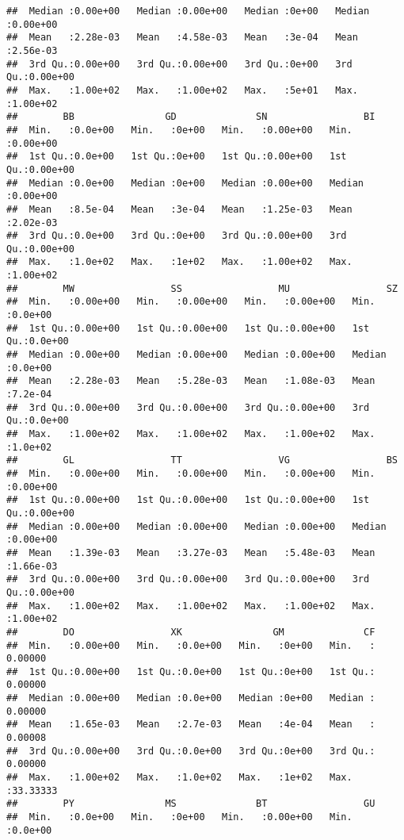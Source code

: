 \documentclass[
]{article}
\begin{document}
\begin{verbatim}
##  Median :0.00e+00   Median :0.00e+00   Median :0e+00   Median :0.00e+00  
##  Mean   :2.28e-03   Mean   :4.58e-03   Mean   :3e-04   Mean   :2.56e-03  
##  3rd Qu.:0.00e+00   3rd Qu.:0.00e+00   3rd Qu.:0e+00   3rd Qu.:0.00e+00  
##  Max.   :1.00e+02   Max.   :1.00e+02   Max.   :5e+01   Max.   :1.00e+02  
##        BB                GD              SN                 BI          
##  Min.   :0.0e+00   Min.   :0e+00   Min.   :0.00e+00   Min.   :0.00e+00  
##  1st Qu.:0.0e+00   1st Qu.:0e+00   1st Qu.:0.00e+00   1st Qu.:0.00e+00  
##  Median :0.0e+00   Median :0e+00   Median :0.00e+00   Median :0.00e+00  
##  Mean   :8.5e-04   Mean   :3e-04   Mean   :1.25e-03   Mean   :2.02e-03  
##  3rd Qu.:0.0e+00   3rd Qu.:0e+00   3rd Qu.:0.00e+00   3rd Qu.:0.00e+00  
##  Max.   :1.0e+02   Max.   :1e+02   Max.   :1.00e+02   Max.   :1.00e+02  
##        MW                 SS                 MU                 SZ         
##  Min.   :0.00e+00   Min.   :0.00e+00   Min.   :0.00e+00   Min.   :0.0e+00  
##  1st Qu.:0.00e+00   1st Qu.:0.00e+00   1st Qu.:0.00e+00   1st Qu.:0.0e+00  
##  Median :0.00e+00   Median :0.00e+00   Median :0.00e+00   Median :0.0e+00  
##  Mean   :2.28e-03   Mean   :5.28e-03   Mean   :1.08e-03   Mean   :7.2e-04  
##  3rd Qu.:0.00e+00   3rd Qu.:0.00e+00   3rd Qu.:0.00e+00   3rd Qu.:0.0e+00  
##  Max.   :1.00e+02   Max.   :1.00e+02   Max.   :1.00e+02   Max.   :1.0e+02  
##        GL                 TT                 VG                 BS          
##  Min.   :0.00e+00   Min.   :0.00e+00   Min.   :0.00e+00   Min.   :0.00e+00  
##  1st Qu.:0.00e+00   1st Qu.:0.00e+00   1st Qu.:0.00e+00   1st Qu.:0.00e+00  
##  Median :0.00e+00   Median :0.00e+00   Median :0.00e+00   Median :0.00e+00  
##  Mean   :1.39e-03   Mean   :3.27e-03   Mean   :5.48e-03   Mean   :1.66e-03  
##  3rd Qu.:0.00e+00   3rd Qu.:0.00e+00   3rd Qu.:0.00e+00   3rd Qu.:0.00e+00  
##  Max.   :1.00e+02   Max.   :1.00e+02   Max.   :1.00e+02   Max.   :1.00e+02  
##        DO                 XK                GM              CF          
##  Min.   :0.00e+00   Min.   :0.0e+00   Min.   :0e+00   Min.   : 0.00000  
##  1st Qu.:0.00e+00   1st Qu.:0.0e+00   1st Qu.:0e+00   1st Qu.: 0.00000  
##  Median :0.00e+00   Median :0.0e+00   Median :0e+00   Median : 0.00000  
##  Mean   :1.65e-03   Mean   :2.7e-03   Mean   :4e-04   Mean   : 0.00008  
##  3rd Qu.:0.00e+00   3rd Qu.:0.0e+00   3rd Qu.:0e+00   3rd Qu.: 0.00000  
##  Max.   :1.00e+02   Max.   :1.0e+02   Max.   :1e+02   Max.   :33.33333  
##        PY                MS              BT                 GU         
##  Min.   :0.0e+00   Min.   :0e+00   Min.   :0.00e+00   Min.   :0.0e+00  

\end{verbatim}
\end{document}

